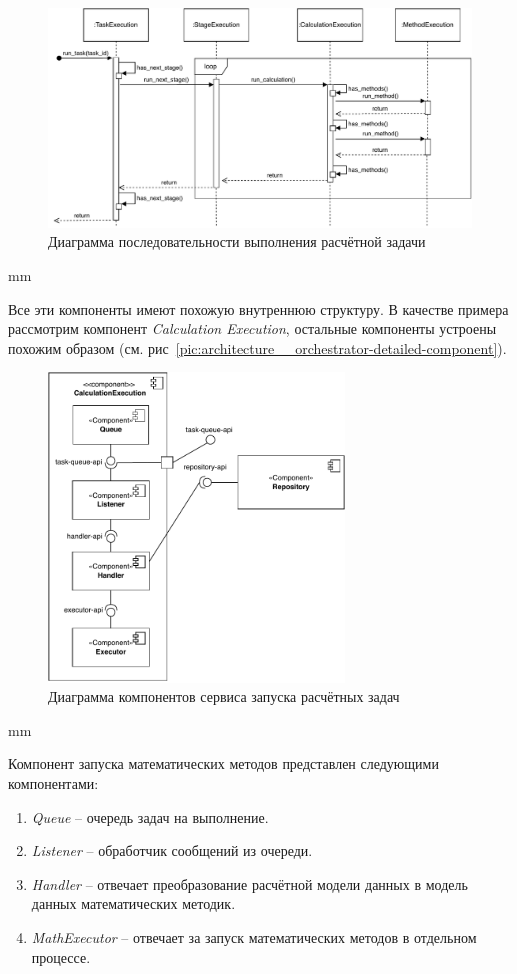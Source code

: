 \begin{figure}[H]
	\includegraphics[width=\textwidth]{architecture/pictures/orchestrator/sequence}
	\caption{Диаграмма последовательности выполнения расчётной задачи}
	\label{pic:architecture__orchestrator-sequence}
\end{figure}
 mm

Все эти компоненты имеют похожую внутреннюю структуру. В качестве примера рассмотрим компонент
\textit{Calculation Execution}, остальные компоненты устроены похожим образом
(см. рис\ \ref{pic:architecture__orchestrator-detailed-component}).

\begin{figure}[H]
	\includegraphics[width=0.7\textwidth]{architecture/pictures/orchestrator/calculation_component}
	\caption{Диаграмма компонентов сервиса запуска расчётных задач}
	\label{pic:architecture__orchestrator-task-execution-component}
\end{figure}
 mm

Компонент запуска математических методов представлен следующими компонентами:
\begin{enumerate}
	\item {
		\textit{Queue} -- очередь задач на выполнение.
	}
	\item {
		\textit{Listener} -- обработчик сообщений из очереди.
	}
	\item {
		\textit{Handler} -- отвечает преобразование расчётной модели данных в модель данных математических методик.
	}
	\item {
		\textit{MathExecutor} -- отвечает за запуск математических методов в отдельном процессе.
	}
\end{enumerate}